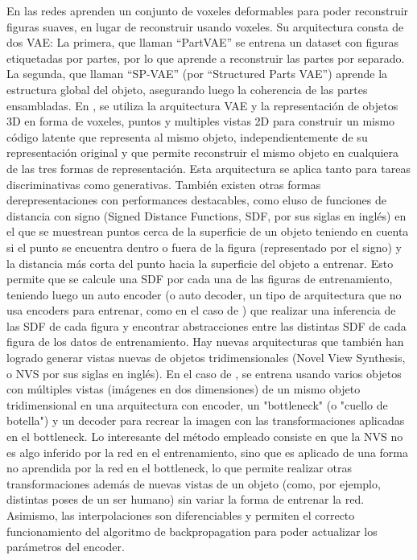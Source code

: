 \documentclass[spanish]{article}
\begin{document}
En \cite{Gao2019} las redes aprenden un conjunto de voxeles deformables
para poder reconstruir figuras suaves, en lugar de reconstruir usando
voxeles. Su arquitectura consta de dos VAE: La primera, que llaman
``PartVAE'' se entrena un dataset con figuras etiquetadas por partes,
por lo que aprende a reconstruir las partes por separado. La segunda,
que llaman ``SP-VAE'' (por ``Structured Parts VAE'') aprende la
estructura global del objeto, asegurando luego la coherencia de las
partes ensambladas. En \cite{Muralikrishnan2019}, se utiliza la arquitectura VAE y la representación de objetos 3D en forma de voxeles, puntos y multiples vistas 2D para construir un mismo código latente que representa al mismo objeto, independientemente de su representación original y que permite reconstruir el mismo objeto en cualquiera de las tres formas de representación. Esta arquitectura se aplica tanto para tareas discriminativas como generativas. También existen otras formas derepresentaciones con performances destacables, como eluso de funciones de distancia con signo \cite{Park2019} (Signed Distance Functions, SDF, por sus siglas en inglés) en el que se muestrean puntos
cerca de la superficie de un objeto teniendo en cuenta si el punto
se encuentra dentro o fuera de la figura (representado por el signo)
y la distancia más corta del punto hacia la superficie del objeto
a entrenar. Esto permite que se calcule una SDF por cada una de las
figuras de entrenamiento, teniendo luego un auto encoder (o auto decoder, un tipo de arquitectura que no usa encoders para entrenar, como en el caso de \cite{Park2019}) que realizar una inferencia de las SDF
de cada figura y encontrar abstracciones entre las distintas SDF de
cada figura de los datos de entrenamiento. Hay nuevas arquitecturas
\cite{Olszewski2019} que también han logrado generar vistas nuevas
de objetos tridimensionales (Novel View Synthesis, o NVS por sus siglas
en inglés). En el caso de \cite{Olszewski2019}, se entrena usando varios objetos con múltiples vistas (imágenes en dos dimensiones) de un mismo objeto tridimensional en una arquitectura con encoder, un "bottleneck" (o "cuello de botella") y un decoder para recrear la imagen con las transformaciones aplicadas en el bottleneck. Lo interesante del método empleado consiste en que la NVS no es algo inferido por la red en el entrenamiento, sino que es aplicado de una forma no aprendida por la red en el bottleneck, lo que permite realizar otras transformaciones además de nuevas vistas de un objeto (como, por ejemplo, distintas poses de un ser humano) sin variar la forma de entrenar la red. Asimismo, las interpolaciones son diferenciables y permiten el correcto funcionamiento del algoritmo de backpropagation para poder actualizar los parámetros del encoder.
\end{document}
